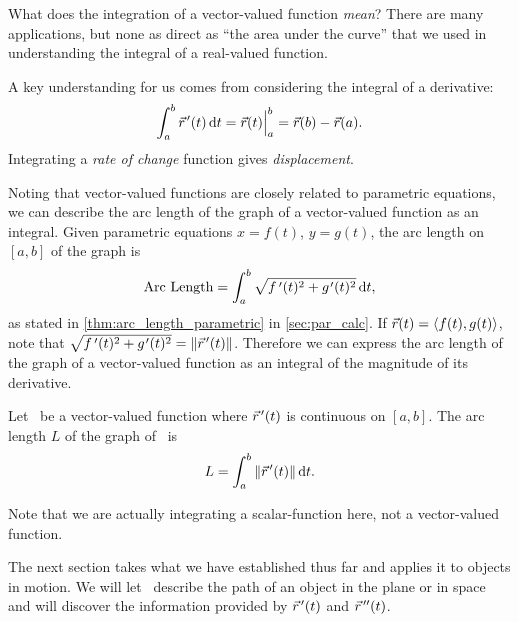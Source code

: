 What does the integration of a vector-valued function \emph{mean}? There are many applications, but none as direct as ``the area under the curve'' that we used in understanding the integral of a real-valued function.

A key understanding for us comes from considering the integral of a derivative: \[\int_a^b \vec r\hskip1.25pt '(t)\operatorname{d}\! t = \vec r(t)\Big|_a^b = \vec r(b)-\vec r(a).\]
Integrating a \emph{rate of change} function gives \emph{displacement}.

Noting that vector-valued functions are closely related to parametric equations, we can describe the arc length of the graph of a vector-valued function as an integral. Given parametric equations $x=f(t)$, $y=g(t)$, the arc length on $[a,b]$ of the graph is
\[\text{Arc Length} = \int_a^b\sqrt{\fp(t)^2+g\primeskip'(t)^2}\dd t,\]
as stated in \autoref{thm:arc_length_parametric} in \autoref{sec:par_calc}. If $\vec r(t) =\left\langle f(t), g(t)\right\rangle$, note that $\sqrt{\fp(t)^2+g\primeskip'(t)^2} = \norm{\vrp(t)}$. Therefore we can express the arc length of the graph of a vector-valued function as an integral of the magnitude of its derivative.

\begin{theorem}\label{thm:vvf_arc_length}%
Let \vrt\ be a vector-valued function where $\vec r\hskip1.25pt '(t)$ is continuous on $[a,b]$. The arc length $L$ of the graph of \vrt\ is 
\[L = \int_a^b \left\lVert \vec r\hskip1.25pt '(t) \right\rVert\operatorname{d}\! t.\]
\end{theorem}

Note that we are actually integrating a scalar-function here, not a vector-valued function.

The next section takes what we have established thus far and applies it to objects in motion. We will let \vrt\ describe the path of an object in the plane or in space and will discover the information provided by $\vec r\hskip1.25pt '(t)$ and $\vec r\hskip1.25pt ''(t)$.

